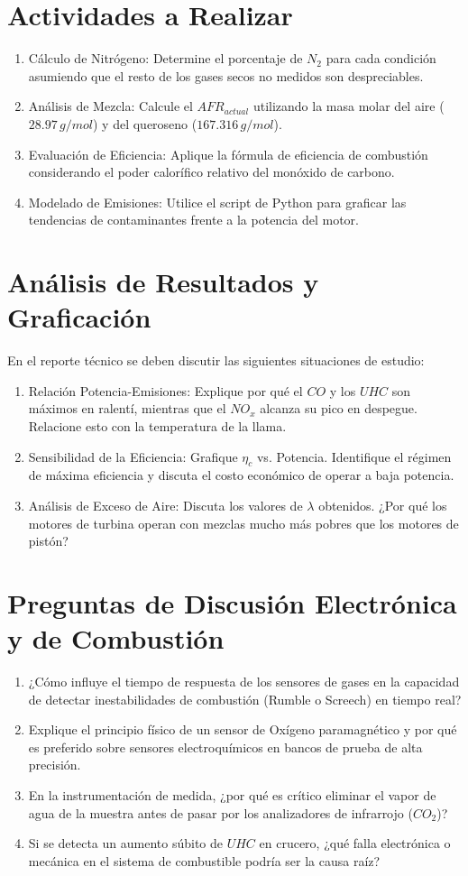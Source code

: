 \documentclass[11pt, a4paper]{article}
\begin{document}
\section{Actividades a Realizar}
\begin{enumerate}
    \item Cálculo de Nitrógeno: Determine el porcentaje de $N_2$ para cada condición asumiendo que el resto de los gases secos no medidos son despreciables.
    \item Análisis de Mezcla: Calcule el $AFR_{actual}$ utilizando la masa molar del aire ($28.97\,g/mol$) y del queroseno ($167.316\,g/mol$).
    \item Evaluación de Eficiencia: Aplique la fórmula de eficiencia de combustión considerando el poder calorífico relativo del monóxido de carbono.
    \item Modelado de Emisiones: Utilice el script de Python para graficar las tendencias de contaminantes frente a la potencia del motor.
\end{enumerate}

\section{Análisis de Resultados y Graficación}
En el reporte técnico se deben discutir las siguientes situaciones de estudio:
\begin{enumerate}
    \item Relación Potencia-Emisiones: Explique por qué el $CO$ y los $UHC$ son máximos en ralentí, mientras que el $NO_x$ alcanza su pico en despegue. Relacione esto con la temperatura de la llama.
    \item Sensibilidad de la Eficiencia: Grafique $\eta_c$ vs. Potencia. Identifique el régimen de máxima eficiencia y discuta el costo económico de operar a baja potencia.
    \item Análisis de Exceso de Aire: Discuta los valores de $\lambda$ obtenidos. ¿Por qué los motores de turbina operan con mezclas mucho más pobres que los motores de pistón?
\end{enumerate}

\section{Preguntas de Discusión Electrónica y de Combustión}
\begin{enumerate}
    \item ¿Cómo influye el tiempo de respuesta de los sensores de gases en la capacidad de detectar inestabilidades de combustión (Rumble o Screech) en tiempo real?
    \item Explique el principio físico de un sensor de Oxígeno paramagnético y por qué es preferido sobre sensores electroquímicos en bancos de prueba de alta precisión.
    \item En la instrumentación de medida, ¿por qué es crítico eliminar el vapor de agua de la muestra antes de pasar por los analizadores de infrarrojo ($CO_2$)?
    \item Si se detecta un aumento súbito de $UHC$ en crucero, ¿qué falla electrónica o mecánica en el sistema de combustible podría ser la causa raíz?
\end{enumerate}
\end{document}
